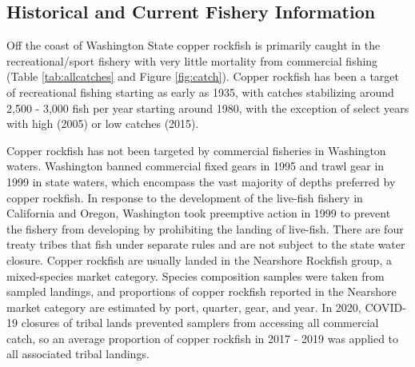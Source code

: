 \documentclass[11pt,
  english,
  a4paper,
]{article}
\begin{document}
\leavevmode\tagmcend\tagstructend\par


\hypertarget{historical-and-current-fishery-information}{%
\subsection{Historical and Current Fishery Information}\label{historical-and-current-fishery-information}}

\leavevmode\tagmcend\tagstructend


Off the coast of Washington State copper rockfish is primarily caught in the recreational/sport fishery with very little mortality from commercial fishing (Table \ref{tab:allcatches} and Figure \ref{fig:catch}). Copper rockfish has been a target of recreational fishing starting as early as 1935, with catches stabilizing around 2,500 - 3,000 fish per year starting around 1980, with the exception of select years with high (2005) or low catches (2015).

\leavevmode\tagmcend\tagstructend\par


Copper rockfish has not been targeted by commercial fisheries in Washington waters. Washington banned commercial fixed gears in 1995 and trawl gear in 1999 in state waters, which encompass the vast majority of depths preferred by copper rockfish. In response to the development of the live-fish fishery in California and Oregon, Washington took preemptive action in 1999 to prevent the fishery from developing by prohibiting the landing of live-fish. There are four treaty tribes that fish under separate rules and are not subject to the state water closure. Copper rockfish are usually landed in the Nearshore Rockfish group, a mixed-species market category. Species composition samples were taken from sampled landings, and proportions of copper rockfish reported in the Nearshore market category are estimated by port, quarter, gear, and year. In 2020, COVID-19 closures of tribal lands prevented samplers from accessing all commercial catch, so an average proportion of copper rockfish in 2017 - 2019 was applied to all associated tribal landings.

\leavevmode\tagmcend\tagstructend\par
\end{document}

